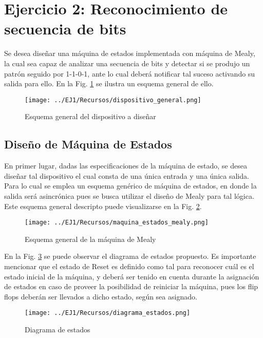 \section{Ejercicio 2: Reconocimiento de secuencia de bits}
Se desea dise\~nar una m\'aquina de estados implementada con m\'aquina de Mealy, la cual sea capaz de analizar una secuencia de bits y detectar si se produjo un patr\'on
seguido por 1-1-0-1, ante lo cual deber\'a notificar tal suceso activando su salida para ello. En la Fig. \ref{fig:esquema_general_dispositivo} se ilustra un esquema general de ello.

\begin{figure}[H]
    \centering
    \texttt{[image: ../EJ1/Recursos/dispositivo\_general.png]}
    \caption{Esquema general del dispositivo a dise\~nar}
    \label{fig:esquema_general_dispositivo}
\end{figure}

\subsection{Dise\~no de M\'aquina de Estados}
En primer lugar, dadas las especificaciones de la m\'aquina de estado, se desea dise\~nar tal dispositivo el cual consta de una \'unica entrada y una \'unica salida. Para lo cual se
emplea un esquema gen\'erico de m\'aquina de estados, en donde la salida ser\'a asincr\'onica pues se busca utilizar el dise\~no de Mealy para tal l\'ogica. Este esquema general descripto
puede visualizarse en la Fig. \ref{fig:esquema_general_mealy}.

\begin{figure}[H]
    \centering
    \texttt{[image: ../EJ1/Recursos/maquina\_estados\_mealy.png]}
    \caption{Esquema general de la m\'aquina de Mealy}
    \label{fig:esquema_general_mealy}
\end{figure}

En la Fig. \ref{fig:diagrama_estados_ejercicio_2} se puede observar el diagrama de estados propuesto. Es importante mencionar que el estado de Reset es definido como tal
para reconocer cu\'al es el estado inicial de la m\'aquina, y deber\'a ser tenido en cuenta durante la asignaci\'on de estados en caso de proveer la posibilidad de reiniciar la m\'aquina,
pues los flip flops deber\'an ser llevados a dicho estado, seg\'un sea asignado.

\begin{figure}[H]
    \centering
    \texttt{[image: ../EJ1/Recursos/diagrama\_estados.png]}
    \caption{Diagrama de estados}
    \label{fig:diagrama_estados_ejercicio_2}
\end{figure}

